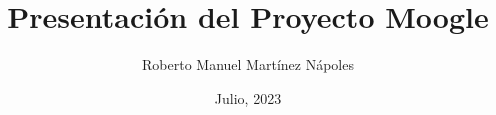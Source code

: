 \documentclass[12pt]{beamer}
\title[Moogle]{Presentación del Proyecto Moogle}
\author{Roberto Manuel Martínez Nápoles}
\institute[Matcom]{Facultad de Matemática y Computación\\ Universidad de La Habana}
\date{Julio, 2023}
\begin{document}
	\frame{\titlepage}
	\frame{\tableofcontents}
	
	
\end{document}
